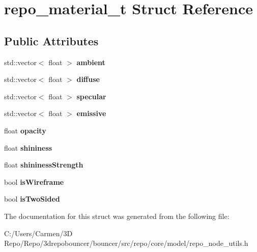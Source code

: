 \hypertarget{structrepo__material__t}{}\section{repo\+\_\+material\+\_\+t Struct Reference}
\label{structrepo__material__t}
\subsection*{Public Attributes}
\begin{DoxyCompactItemize}
\item 
\hypertarget{structrepo__material__t_acc39d617cb31b9f8417a53e464946733}{}std\+::vector$<$ float $>$ {\bfseries ambient}\label{structrepo__material__t_acc39d617cb31b9f8417a53e464946733}

\item 
\hypertarget{structrepo__material__t_ad9b46adb8b69f65d077f95877fb56b17}{}std\+::vector$<$ float $>$ {\bfseries diffuse}\label{structrepo__material__t_ad9b46adb8b69f65d077f95877fb56b17}

\item 
\hypertarget{structrepo__material__t_a2412943dd92702fdcd4d836cf0b91f79}{}std\+::vector$<$ float $>$ {\bfseries specular}\label{structrepo__material__t_a2412943dd92702fdcd4d836cf0b91f79}

\item 
\hypertarget{structrepo__material__t_ae25a423c04f1222cc5c5251dfbedab59}{}std\+::vector$<$ float $>$ {\bfseries emissive}\label{structrepo__material__t_ae25a423c04f1222cc5c5251dfbedab59}

\item 
\hypertarget{structrepo__material__t_a5ddee39ae30e46d7df9ab92164a70e78}{}float {\bfseries opacity}\label{structrepo__material__t_a5ddee39ae30e46d7df9ab92164a70e78}

\item 
\hypertarget{structrepo__material__t_a58128a39e5d8834c1ff4285be45f9d02}{}float {\bfseries shininess}\label{structrepo__material__t_a58128a39e5d8834c1ff4285be45f9d02}

\item 
\hypertarget{structrepo__material__t_af43b3c2118c59f3f21e620d74910664b}{}float {\bfseries shininess\+Strength}\label{structrepo__material__t_af43b3c2118c59f3f21e620d74910664b}

\item 
\hypertarget{structrepo__material__t_a4b6b0aba0c04a5cf3528f9c133133c61}{}bool {\bfseries is\+Wireframe}\label{structrepo__material__t_a4b6b0aba0c04a5cf3528f9c133133c61}

\item 
\hypertarget{structrepo__material__t_ac6341815992c22777814997f7d7278e5}{}bool {\bfseries is\+Two\+Sided}\label{structrepo__material__t_ac6341815992c22777814997f7d7278e5}

\end{DoxyCompactItemize}


The documentation for this struct was generated from the following file\+:\begin{DoxyCompactItemize}
\item 
C\+:/\+Users/\+Carmen/3\+D Repo/\+Repo/3drepobouncer/bouncer/src/repo/core/model/repo\+\_\+node\+\_\+utils.\+h\end{DoxyCompactItemize}
